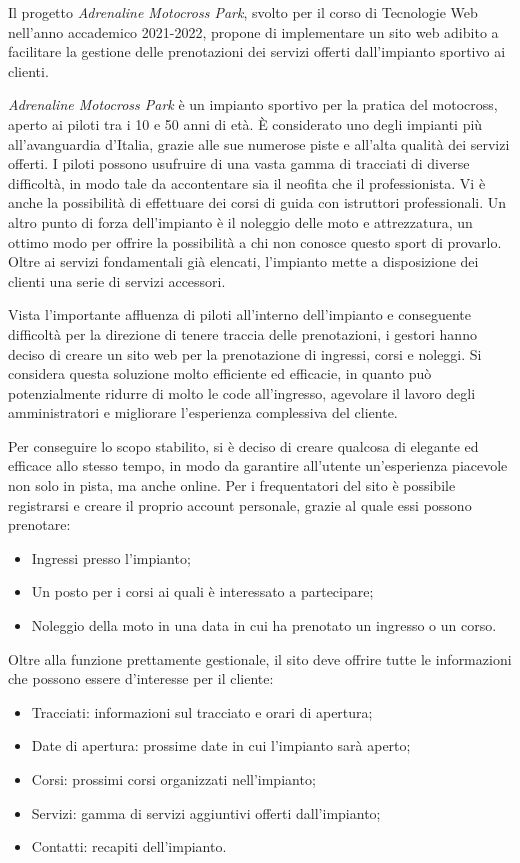 Il progetto \textit{Adrenaline Motocross Park}, svolto per il corso di Tecnologie Web nell'anno accademico 2021-2022, propone di implementare un sito web adibito a facilitare la gestione delle prenotazioni dei servizi offerti dall'impianto sportivo ai clienti.

\textit{Adrenaline Motocross Park} è un impianto sportivo per la pratica del motocross, aperto ai piloti tra i 10 e 50 anni di età. È considerato uno degli impianti più all'avanguardia d'Italia, grazie alle sue numerose piste e all'alta qualità dei servizi offerti. I piloti possono usufruire di una vasta gamma di tracciati di diverse difficoltà, in modo tale da accontentare sia il neofita che il professionista. Vi è anche la possibilità di effettuare dei corsi di guida con istruttori professionali. Un altro punto di forza dell'impianto è il noleggio delle moto e attrezzatura, un ottimo modo per offrire la possibilità a chi non conosce questo sport di provarlo. Oltre ai servizi fondamentali già elencati, l'impianto mette a disposizione dei clienti una serie di servizi accessori.

Vista l'importante affluenza di piloti all'interno dell'impianto e conseguente difficoltà per la direzione di tenere traccia delle prenotazioni, i gestori hanno deciso di creare un sito web per la prenotazione di ingressi, corsi e noleggi. Si considera questa soluzione molto efficiente ed efficacie, in quanto può potenzialmente ridurre di molto le code all'ingresso, agevolare il lavoro degli amministratori e migliorare l'esperienza complessiva del cliente.

Per conseguire lo scopo stabilito, si è deciso di creare qualcosa di elegante ed efficace allo stesso tempo, in modo da garantire all'utente un'esperienza piacevole non solo in pista, ma anche online. Per i frequentatori del sito è possibile registrarsi e creare il proprio account personale, grazie al quale essi possono prenotare:
\begin{itemize}
\item Ingressi presso l'impianto;
\item Un posto per i corsi ai quali è interessato a partecipare;
\item Noleggio della moto in una data in cui ha prenotato un ingresso o un corso.
\end{itemize}

Oltre alla funzione prettamente gestionale, il sito deve offrire tutte le informazioni che possono essere d'interesse per il cliente:
\begin{itemize}
\item Tracciati: informazioni sul tracciato e orari di apertura;
\item Date di apertura: prossime date in cui l'impianto sarà aperto;
\item Corsi: prossimi corsi organizzati nell'impianto;
\item Servizi: gamma di servizi aggiuntivi offerti dall'impianto;
\item Contatti: recapiti dell'impianto.
\end{itemize}